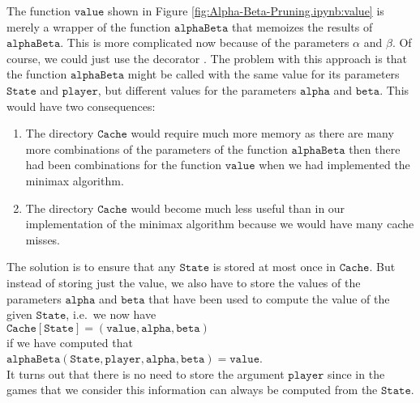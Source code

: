 The function $\texttt{value}$ shown in Figure \ref{fig:Alpha-Beta-Pruning.ipynb:value} is merely a wrapper of
the function $\mathtt{alphaBeta}$ that memoizes the results of $\mathtt{alphaBeta}$.  This is more complicated
now because of the parameters $\alpha$ and $\beta$.  Of course, we could just use the decorator
\texttt{\@memoize}.  The problem with this approach is that the function $\mathtt{alphaBeta}$ might be called
with the same value for its parameters $\mathtt{State}$ and $\mathtt{player}$, but different values for the
parameters $\mathtt{alpha}$ and $\mathtt{beta}$.  This would have two consequences:
\begin{enumerate}
\item The directory $\mathtt{Cache}$ would require much more memory as there are many more combinations of the parameters
      of the function $\texttt{alphaBeta}$ then there had been combinations for the function $\mathtt{value}$ when
      we had implemented the minimax algorithm.  
\item The directory $\texttt{Cache}$ would become much less useful than in our implementation of the minimax
      algorithm because we would have many cache misses.  
\end{enumerate}
The solution is to ensure that any $\mathtt{State}$ is stored at most once in $\mathtt{Cache}$.  But instead of storing just the
value, we also have to store the values of the parameters $\mathtt{alpha}$ and $\mathtt{beta}$ that have been
used to compute the value of the given $\mathtt{State}$, i.e.~we now have
\\[0.2cm]
\hspace*{1.3cm}
$\mathtt{Cache}[\mathtt{State}] = (\mathtt{value}, \mathtt{alpha}, \mathtt{beta})$
\\[0.2cm]
if we have computed that
\\[0.2cm]
\hspace*{1.3cm}
$\mathtt{alphaBeta}(\mathtt{State}, \mathtt{player}, \mathtt{alpha}, \mathtt{beta}) = \mathtt{value}$.
\\[0.2cm]
It turns out that there is no need to store the argument $\mathtt{player}$ since in the games that we consider
this information can always be computed from the $\mathtt{State}$.

